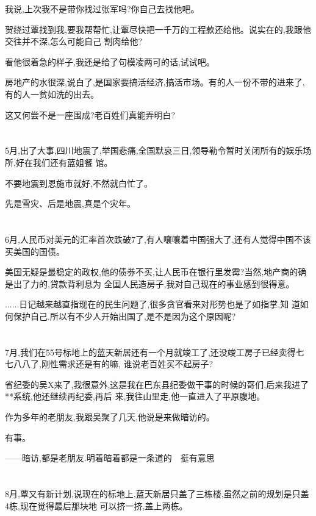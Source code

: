 \documentclass[11pt]{article}
\begin{document}
我说,上次我不是带你找过张军吗?你自己去找他吧。

贺绕过覃找到我,要我帮帮忙,让覃尽快把一千万的工程款还给他。说实在的,我跟他交往并不深,怎么可能自己
割肉给他?

看他很着急的样子,我还是给了句模凌两可的话,试试吧。

房地产的水很深,说白了,是国家要搞活经济,搞活市场。有的人一份不带的进来了,有的人一贫如洗的出去。

这又何尝不是一座围成?老百姓们真能弄明白?



\section{}
5月,出了大事,四川地震了,举国悲痛,全国默哀三日,领导勒令暂时关闭所有的娱乐场所,好在我们还有蓝姐餐
馆。

不要地震到恩施市就好,不然就白忙了。

先是雪灾、后是地震,真是个灾年。

\section{}
6月,人民币对美元的汇率首次跌破7了,有人嚷嚷着中国强大了,还有人觉得中国不该买美国的国债。

美国无疑是最稳定的政权,他的债券不买,让人民币在银行里发霉?当然,地产商的确是出了力的,贷款背利息为
全国人民造房子,我对自己现在的事业感到很得意。

......日记越来越直指现在的民生问题了,很多贪官看来对形势也是了如指掌,知
道如何保护自己.所以有不少人开始出国了,是不是因为这个原因呢?

\section{}
7月,我们在55号标地上的蓝天新居还有一个月就竣工了,还没竣工房子已经卖得七七八八了,刚性需求还是有的嘛,
谁说老百姓买不起房子?

省纪委的吴X来了,我很意外,这是我在巴东县纪委做干事的时候的哥们,后来我进了**系统,他还继续再纪委,再后
来,我往山里走,他一直进入了平原腹地。

作为多年的老朋友,我跟吴聚了几天,他说是来做暗访的。

有事。

------暗访,都是老朋友.明着暗着都是一条道的~~挺有意思

\section{}
8月,覃又有新计划,说现在的标地上,蓝天新居只盖了三栋楼,虽然之前的规划是只盖4栋,现在觉得最后那块地
可以挤一挤,盖上两栋。
\end{document}
